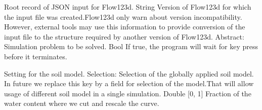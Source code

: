 \begin{RecordType}
	{}
	{} %
	{} %
	{} %
	{{{Root record of JSON input for Flow123d.}}}
		\KeyItem
			{}
			{{String}}
			{\textrangle}
			{} %
			{{{Version of Flow123d for which the input file was created.Flow123d only warn about version incompatibility. However, external tools may use this information to provide conversion of the input file to the structure required by another version of Flow123d.}}}
		\KeyItem
			{}
			{{Abstract}{: }}
			{\textrangle}
			{} %
			{{{Simulation problem to be solved.}}}
		\KeyItem
			{}
			{{Bool}}
			{\textrangle}
			{} %
			{{{If true, the program will wait for key press before it terminates.}}}
\end{RecordType}
\begin{RecordType}
	{}
	{} %
	{} %
	{} %
	{{{Setting for the soil model.}}}
		\KeyItem
			{}
			{{Selection}{: }}
			{\textrangle}
			{} %
			{{{Selection of the globally applied soil model. In future we replace this key by a field for selection of the model.That will allow usage of different soil model in a single simulation.}}}
		\KeyItem
			{}
			{{Double [0, 1]}}
			{\textrangle}
			{} %
			{{{Fraction of the water content where we cut  and rescale the curve.}}}
\end{RecordType}
